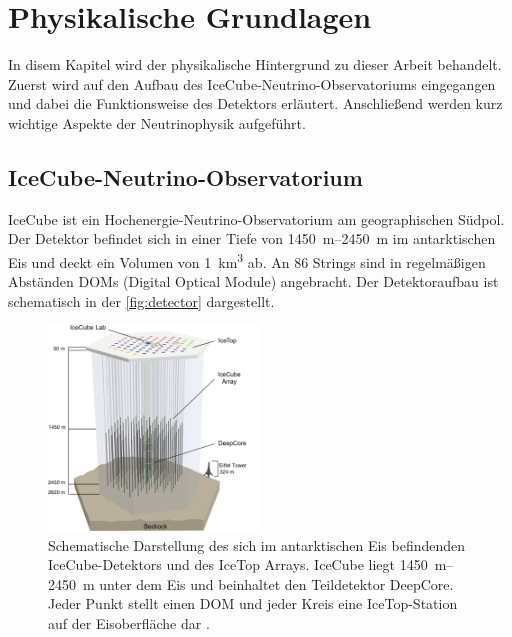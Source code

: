 \chapter{Physikalische Grundlagen}
In disem Kapitel wird der physikalische Hintergrund zu dieser Arbeit behandelt.
Zuerst wird auf den Aufbau des IceCube-Neutrino-Observatoriums eingegangen und dabei die Funktionsweise des Detektors erläutert.
Anschließend werden kurz wichtige Aspekte der Neutrinophysik aufgeführt.

\section{IceCube-Neutrino-Observatorium} \label{sec:icecube}

IceCube ist ein Hochenergie-Neutrino-Observatorium am geographischen Südpol.
Der Detektor befindet sich in einer Tiefe von \SIrange{1450}{2450}{\metre} im antarktischen Eis und deckt ein Volumen von \SI{1}{\kilo\metre^3} ab.\cite{icecube_detector}
An 86 Strings sind in regelmäßigen Abständen DOMs (Digital Optical Module) angebracht.
Der Detektoraufbau ist schematisch in der \autoref{fig:detector} dargestellt.
\begin{figure}
    \centering
    \includegraphics[width=0.5\textwidth]{Plots/detector2.png}
    \caption[IceCube-Detektor und IceTop Array]{Schematische Darstellung des sich im antarktischen Eis befindenden IceCube-Detektors und des IceTop Arrays.
    IceCube liegt \SIrange{1450}{2450}{\metre} unter dem Eis und beinhaltet den Teildetektor DeepCore.
    Jeder Punkt stellt einen DOM und jeder Kreis eine IceTop-Station auf der Eisoberfläche dar \cite{Ahlers_2018}.
    }
    \label{fig:detector}
\end{figure}

